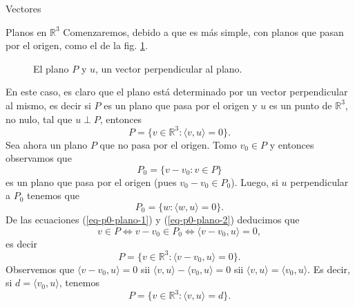 \documentclass[a4paper,12pt,twoside,spanish,reqno]{amsbook}
\theoremstyle{definition}
\theoremstyle{remark}
\newcommand{\la}{\langle}
\newcommand{\ra}{\rangle}
\newcommand{\R}{\mathbb R}
\begin{document}
\begin{chapter}{Vectores}
\begin{section}{Planos en $\R^3$}
        Comenzaremos, debido a que es más simple, con planos que  pasan por el origen,  como el de la fig. \ref{fig-plano-por-origen}.
        \begin{figure}[h]
            \caption{El plano $P$ y $u$, un vector  perpendicular al plano.}
            \label{fig-plano-por-origen}
        \end{figure} 
    
        En  este caso,  es claro que el plano está determinado por un vector perpendicular al mismo, es decir si $P$  es un plano que pasa por el origen y $u$ es un punto de $\R^3$, no nulo, tal que $u \perp P$,  entonces
        \begin{equation*}
            P = \{ v \in \R^3: \la v,u \ra=0 \}. 
        \end{equation*}
        Sea ahora un  plano $P$ que no pasa por el origen.  Tomo $v_0 \in P$ y entonces observamos que
        \begin{equation}\label{eq-p0-plano-1}
            P_0 = \{v-v_0: v \in P \}
        \end{equation} 
        es un plano que pasa por el origen (pues $v_0-v_0 \in P_0$). Luego,  si $u$ perpendicular a $P_0$ tenemos que
        \begin{equation}\label{eq-p0-plano-2}
        P_0 = \{w: \la w,u \ra=0\}.
        \end{equation}
        De las ecuaciones (\ref{eq-p0-plano-1}) y  (\ref{eq-p0-plano-2}) deducimos que 
        \begin{equation*}
            v \in P \Leftrightarrow v-v_0 \in P_0 \Leftrightarrow \la v-v_0,u \ra=0,
        \end{equation*}
         es decir
        \begin{equation*}
            P = \{ v \in \R^3: \la v-v_0,u \ra=0 \}. 
        \end{equation*}  
        Observemos que  $\la v-v_0,u \ra=0$ sii $\la v,u \ra-\la v_0,u \ra=0$ sii $\la v,u \ra=\la v_0,u \ra$. Es decir, si $d = \la v_0,u \ra$, tenemos
        \begin{equation*}
        P = \{ v \in \R^3: \la v,u \ra=d \}. 
        \end{equation*} 
        

\end{section}
\end{chapter}
\end{document}
